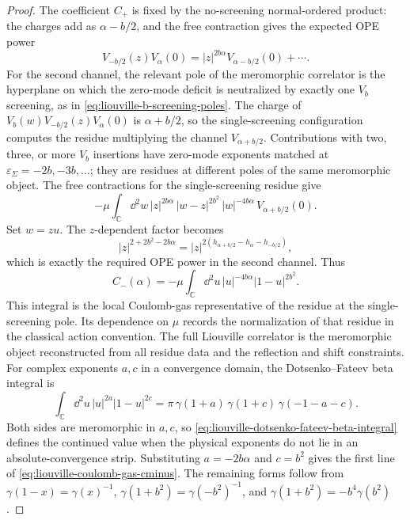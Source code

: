 \begin{proof}
The coefficient \(C_+\) is fixed by the no-screening normal-ordered product:
the charges add as \(\alpha-b/2\), and the free contraction gives the
expected OPE power
\[
  V_{-b/2}(z)V_\alpha(0)
  =
  |z|^{2b\alpha}V_{\alpha-b/2}(0)+\cdots .
\]
For the second channel, the relevant pole of the meromorphic correlator is
the hyperplane on which the zero-mode deficit is neutralized by exactly one
\(V_b\) screening, as in
\eqref{eq:liouville-b-screening-poles}.  The charge of
\(V_b(w)V_{-b/2}(z)V_\alpha(0)\) is \(\alpha+b/2\), so the single-screening
configuration computes the residue multiplying the channel
\(V_{\alpha+b/2}\).  Contributions with two, three, or more \(V_b\)
insertions have zero-mode exponents matched at
\(\varepsilon_\Sigma=-2b,-3b,\ldots\); they are residues at different poles
of the same meromorphic object.  The free contractions for the
single-screening residue give
\[
  -\mu\int_{\mathbb C}\dd^2 w\,
  |z|^{2b\alpha}\,|w-z|^{2b^2}\,|w|^{-4b\alpha}\,
  V_{\alpha+b/2}(0).
\]
Set \(w=zu\).  The \(z\)-dependent factor becomes
\[
  |z|^{2+2b^2-2b\alpha}
  =
  |z|^{2(h_{\alpha+b/2}-h_\alpha-h_{-b/2})},
\]
which is exactly the required OPE power in the second channel.  Thus
\[
  C_-(\alpha)
  =
  -\mu
  \int_{\mathbb C}\dd^2u\,
  |u|^{-4b\alpha}|1-u|^{2b^2}.
\]
This integral is the local Coulomb-gas representative of the residue at the
single-screening pole.  Its dependence on \(\mu\) records the normalization
of that residue in the classical action convention.  The full Liouville
correlator is the meromorphic object reconstructed from all residue data and
the reflection and shift constraints.
For complex exponents \(a,c\) in a convergence domain, the
Dotsenko--Fateev beta integral is
\begin{equation}
  \int_{\mathbb C}\dd^2u\,|u|^{2a}|1-u|^{2c}
  =
  \pi\,
  \gamma(1+a)\,
  \gamma(1+c)\,
  \gamma(-1-a-c).
  \label{eq:liouville-dotsenko-fateev-beta-integral}
\end{equation}
Both sides are meromorphic in \(a,c\), so
\eqref{eq:liouville-dotsenko-fateev-beta-integral} defines the continued
value when the physical exponents do not lie in an absolute-convergence
strip.  Substituting \(a=-2b\alpha\) and \(c=b^2\) gives the first line of
\eqref{eq:liouville-coulomb-gas-cminus}.  The remaining forms follow from
\(\gamma(1-x)=\gamma(x)^{-1}\),
\(\gamma(1+b^2)=\gamma(-b^2)^{-1}\), and
\(\gamma(1+b^2)=-b^4\gamma(b^2)\).
\end{proof}

